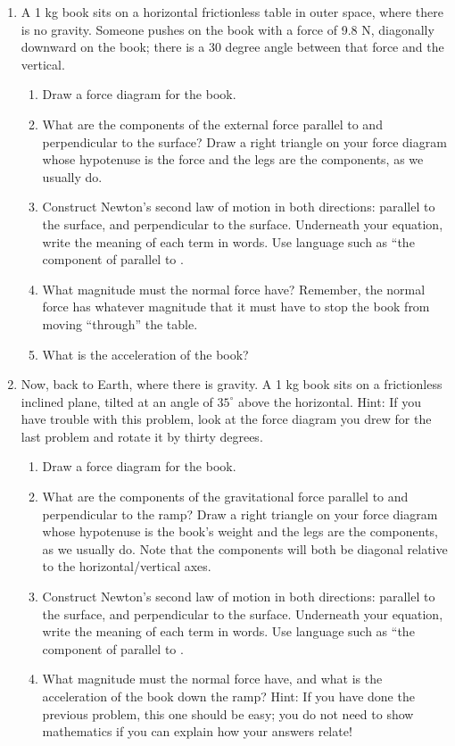 \documentclass[12pt]{article}
\begin{document}
\begin{enumerate}
\item{A 1 kg book sits on a horizontal frictionless table in outer space, where there is no
 	gravity. Someone pushes on the book with a force of 9.8 N, diagonally downward on the book; there is a 30 degree
 	angle between that force and the vertical.}

 	\begin{enumerate}
\item{Draw a force diagram for the book. }
\item{What are the components of the external force parallel to and perpendicular to
 	the surface? Draw a right triangle on your force diagram whose hypotenuse is the
 	force and the legs are the components, as we usually do.}
\item Construct Newton's second law of motion in both directions: parallel to the surface, and perpendicular to the surface. 
Underneath your equation, write the meaning of each term in words. Use language such as ``the component of \underline{\hspace{0.5in}} parallel to \underline{\hspace{0.5in}}.


\item{What magnitude must the normal force have? Remember, the normal force has
 	whatever magnitude that it must have to stop the book from moving ``through''
 	the table.}
\item{What is the acceleration of the book?}
\end{enumerate}

\item{Now, back to Earth, where there is gravity. A 1 kg book sits on a frictionless inclined
 	plane, tilted at an angle of $35^\circ$ above the horizontal. Hint: If you have trouble with
 	this problem, look at the force diagram you drew for the last problem and rotate it by
 	thirty degrees. }
\begin{enumerate}
\item{Draw a force diagram for the book. }
\item{What are the components of the gravitational force parallel to and perpendicular
 	to the ramp? Draw a right triangle on your force diagram whose hypotenuse is
 	the book’s weight and the legs are the components, as we usually do. Note that
 	the components will both be diagonal relative to the horizontal/vertical axes. }
\item Construct Newton's second law of motion in both directions: parallel to the surface, and perpendicular to the surface. 
Underneath your equation, write the meaning of each term in words. Use language such as ``the component of \underline{\hspace{0.5in}} parallel to \underline{\hspace{0.5in}}.
\item{What magnitude must the normal force have, and what is the acceleration of the book down the ramp? Hint: If you have done the
 	previous problem, this one should be easy; you do not need to show mathematics
 	if you can explain how your answers relate!}
\end{enumerate}
 

\end{enumerate}
\end{document}
